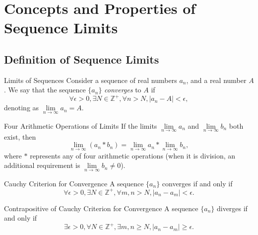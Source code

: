 
\section{Concepts and Properties of Sequence Limits}

\subsection{Definition of Sequence Limits}

\begin{definition}{Limits of Sequences}{}
  Consider a sequence of real numbers $a_n$, and a real number $A$.
  We say that the sequence $\{a_n\}$ \emph{converges} to $A$ if
  \begin{equation}
    \forall \epsilon > 0, \exists N \in \mathbb{Z}^+, \forall n > N, |a_n - A| < \epsilon,
  \end{equation}
  denoting as $\lim \limits _{n \rightarrow \infty}a_n = A$.
\end{definition}

\begin{proposition}{Four Arithmetic Operations of Limits}{}
  If the limits $\lim \limits _{n \rightarrow \infty} a_n$ and $\lim \limits _{n \rightarrow \infty} b_n$
  both exist, then
  \begin{equation}
    \lim \limits _{n \rightarrow \infty} (a_n \ast b_n) = \lim \limits _{n \rightarrow \infty} a_n \ast \lim \limits _{n \rightarrow \infty} b_n,
  \end{equation}
  where $\ast$ represents any of four arithmetic operations
  (when it is division, an additional requirement is $\lim \limits _{n
    \rightarrow \infty} b_n \neq 0$).
\end{proposition}

\begin{theorem}{Cauchy Criterion for Convergence}{}
  A sequence $\{a_n\}$ converges if and only if
  \begin{equation}
    \forall \epsilon > 0, \exists N \in \mathbb{Z}^+, \forall m,n > N, |a_n - a_m| < \epsilon.
  \end{equation}
\end{theorem}

\begin{corollary}{Contrapositive of Cauchy Criterion for Convergence}{}
  A sequence $\{a_n\}$ diverges if and only if
  \begin{equation}
    \exists \epsilon > 0, \forall N \in \mathbb{Z}^+, \exists m, n \geq N, |a_n - a_m| \geq \epsilon.
  \end{equation}
\end{corollary}


